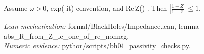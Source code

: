 \begin{theorem}
Assume \(\omega>0\), exp(-i\omega t) convention, and Re\,Z(\omega) .
Then \(\left|\tfrac{1-Z}{1+Z}\right| \le 1\).
\end{theorem}
\noindent\textit{Lean mechanization:} formal/BlackHoles/Impedance.lean, lemma abs_R_from_Z_le_one_of_re_nonneg.\\
\noindent\textit{Numeric evidence:} python/scripts/bh04_passivity_checks.py.
